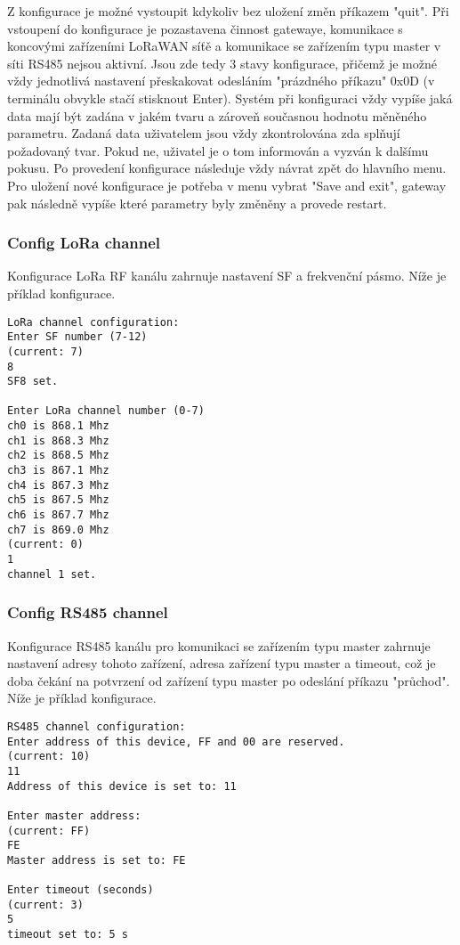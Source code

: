 Z konfigurace je možné vystoupit kdykoliv bez uložení změn příkazem "quit". 
Při vstoupení do konfigurace je pozastavena činnost gatewaye, komunikace s koncovými zařízeními LoRaWAN síťě a komunikace se zařízením typu master v síti RS485 nejsou aktivní.
Jsou zde tedy 3 stavy konfigurace, přičemž je možné vždy jednotlivá nastavení přeskakovat odesláním "prázdného příkazu" 0x0D (v terminálu obvykle stačí stisknout Enter). Systém při konfiguraci vždy vypíše jaká data mají být zadána v jakém tvaru a zároveň současnou hodnotu měněného parametru. Zadaná data uživatelem jsou vždy zkontrolována zda splňují požadovaný tvar. Pokud ne, uživatel je o tom informován a vyzván k dalšímu pokusu.
Po provedení konfigurace následuje vždy návrat zpět do hlavního menu. Pro uložení nové konfigurace je potřeba v menu vybrat "Save and exit", gateway pak následně vypíše které parametry byly změněny a provede restart.

\subsubsection{Config LoRa channel}
Konfigurace LoRa RF kanálu zahrnuje nastavení SF a frekvenční pásmo. Níže je příklad konfigurace.

\begin{lstlisting}
LoRa channel configuration:
Enter SF number (7-12)
(current: 7)
8
SF8 set.

Enter LoRa channel number (0-7)
ch0 is 868.1 Mhz
ch1 is 868.3 Mhz
ch2 is 868.5 Mhz
ch3 is 867.1 Mhz
ch4 is 867.3 Mhz
ch5 is 867.5 Mhz
ch6 is 867.7 Mhz
ch7 is 869.0 Mhz
(current: 0)
1
channel 1 set.
\end{lstlisting}

\subsubsection{Config RS485 channel}
Konfigurace RS485 kanálu pro komunikaci se zařízením typu master zahrnuje nastavení adresy tohoto zařízení, adresa zařízení typu master a timeout, což je doba čekání na potvrzení od zařízení typu master po odeslání příkazu "průchod". Níže je příklad konfigurace.

\begin{lstlisting}
RS485 channel configuration:
Enter address of this device, FF and 00 are reserved.
(current: 10)
11
Address of this device is set to: 11

Enter master address: 
(current: FF)
FE
Master address is set to: FE

Enter timeout (seconds)
(current: 3)
5
timeout set to: 5 s
\end{lstlisting}


